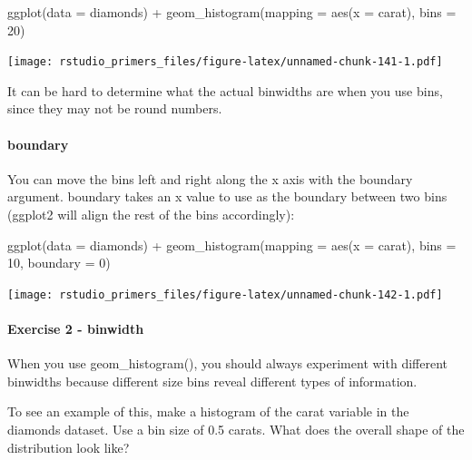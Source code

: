 \documentclass[
]{article}
\newenvironment{Shaded}{\begin{snugshade}}{\end{snugshade}}
\newcommand{\AttributeTok}[1]{\textcolor[rgb]{0.77,0.63,0.00}{#1}}
\newcommand{\DecValTok}[1]{\textcolor[rgb]{0.00,0.00,0.81}{#1}}
\newcommand{\FunctionTok}[1]{\textcolor[rgb]{0.00,0.00,0.00}{#1}}
\newcommand{\NormalTok}[1]{#1}
\newcommand{\SpecialCharTok}[1]{\textcolor[rgb]{0.00,0.00,0.00}{#1}}
\begin{document}
\begin{Shaded}
\begin{Highlighting}[]
\FunctionTok{ggplot}\NormalTok{(}\AttributeTok{data =}\NormalTok{ diamonds) }\SpecialCharTok{+}
  \FunctionTok{geom\_histogram}\NormalTok{(}\AttributeTok{mapping =} \FunctionTok{aes}\NormalTok{(}\AttributeTok{x =}\NormalTok{ carat), }\AttributeTok{bins =} \DecValTok{20}\NormalTok{)}
\end{Highlighting}
\end{Shaded}

\texttt{[image: rstudio\_primers\_files/figure-latex/unnamed-chunk-141-1.pdf]}

It can be hard to determine what the actual binwidths are when you use
bins, since they may not be round numbers.

\hypertarget{boundary}{%
\paragraph{boundary}\label{boundary}}

You can move the bins left and right along the x axis with the boundary
argument. boundary takes an x value to use as the boundary between two
bins (ggplot2 will align the rest of the bins accordingly):

\begin{Shaded}
\begin{Highlighting}[]
\FunctionTok{ggplot}\NormalTok{(}\AttributeTok{data =}\NormalTok{ diamonds) }\SpecialCharTok{+}
  \FunctionTok{geom\_histogram}\NormalTok{(}\AttributeTok{mapping =} \FunctionTok{aes}\NormalTok{(}\AttributeTok{x =}\NormalTok{ carat), }\AttributeTok{bins =} \DecValTok{10}\NormalTok{, }\AttributeTok{boundary =} \DecValTok{0}\NormalTok{)}
\end{Highlighting}
\end{Shaded}

\texttt{[image: rstudio\_primers\_files/figure-latex/unnamed-chunk-142-1.pdf]}

\hypertarget{exercise-2---binwidth}{%
\paragraph{Exercise 2 - binwidth}\label{exercise-2---binwidth}}

When you use geom\_histogram(), you should always experiment with
different binwidths because different size bins reveal different types
of information.

To see an example of this, make a histogram of the carat variable in the
diamonds dataset. Use a bin size of 0.5 carats. What does the overall
shape of the distribution look like?
\end{document}
